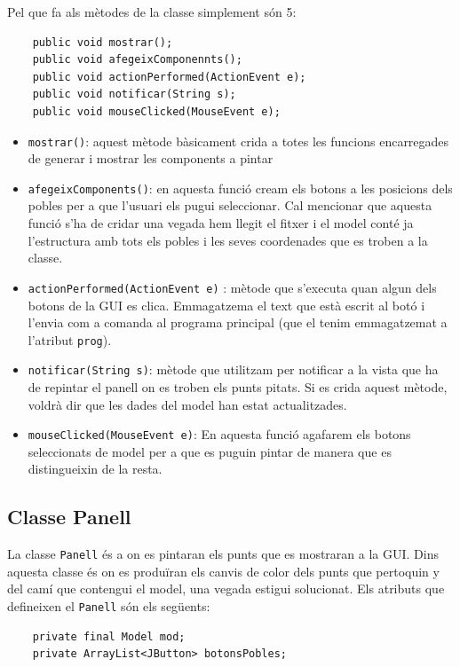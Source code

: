 \documentclass[conference]{IEEEtran}
\begin{document}
Pel que fa als mètodes de la classe simplement són 5:
\begin{verbatim}
    public void mostrar();
    public void afegeixComponennts();
    public void actionPerformed(ActionEvent e);
    public void notificar(String s);
    public void mouseClicked(MouseEvent e);
\end{verbatim}
\begin{itemize}
    \item \texttt{mostrar()}: aquest mètode bàsicament crida a totes les funcions encarregades de generar i mostrar les components a pintar\\
    \item \texttt{afegeixComponents()}: en aquesta funció cream els botons a les posicions dels pobles per a que l'usuari els pugui seleccionar. Cal mencionar que aquesta funció s'ha de cridar una vegada hem llegit el fitxer i el model conté ja l'estructura amb tots els pobles i les seves coordenades que es troben a la classe.\\
    \item \texttt{actionPerformed(ActionEvent e)} : mètode que s'executa quan algun dels botons de la GUI es clica. Emmagatzema el text que està escrit al botó i l'envia com a comanda al programa principal (que el tenim emmagatzemat a l'atribut \texttt{prog}).\\
    \item \texttt{notificar(String s)}: mètode que utilitzam per notificar a la vista que ha de repintar el panell on es troben els punts pitats. Si es crida aquest mètode, voldrà dir que les dades del model han estat actualitzades.\\
    \item  \texttt{mouseClicked(MouseEvent e)}: En aquesta funció agafarem els botons seleccionats de model per a que es puguin pintar de manera que es distingueixin de la resta.
\end{itemize}

\subsection{Classe Panell}
La classe \texttt{Panell} és a on es pintaran els punts que es mostraran a la GUI. Dins aquesta classe és on es produïran els canvis de color dels punts que pertoquin y del camí que contengui el model, una vegada estigui solucionat. Els atributs que defineixen el \texttt{Panell} són els següents:
\begin{verbatim}
    private final Model mod;
    private ArrayList<JButton> botonsPobles;
\end{verbatim}
\end{document}
